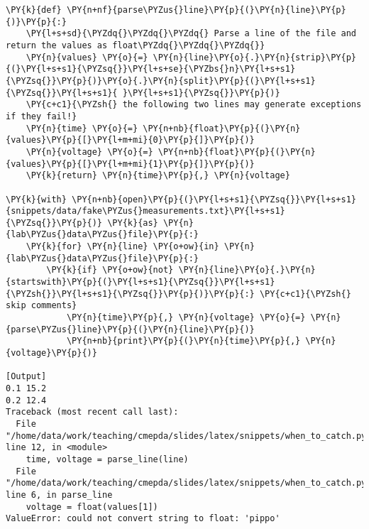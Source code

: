 \begin{Verbatim}[label=\makebox{\url{https://github.com/lucabaldini/cmepda/tree/master/slides/latex/snippets/when\_to\_catch.py}},commandchars=\\\{\}]
\PY{k}{def} \PY{n+nf}{parse\PYZus{}line}\PY{p}{(}\PY{n}{line}\PY{p}{)}\PY{p}{:}
    \PY{l+s+sd}{\PYZdq{}\PYZdq{}\PYZdq{} Parse a line of the file and return the values as float\PYZdq{}\PYZdq{}\PYZdq{}}
    \PY{n}{values} \PY{o}{=} \PY{n}{line}\PY{o}{.}\PY{n}{strip}\PY{p}{(}\PY{l+s+s1}{\PYZsq{}}\PY{l+s+se}{\PYZbs{}n}\PY{l+s+s1}{\PYZsq{}}\PY{p}{)}\PY{o}{.}\PY{n}{split}\PY{p}{(}\PY{l+s+s1}{\PYZsq{}}\PY{l+s+s1}{ }\PY{l+s+s1}{\PYZsq{}}\PY{p}{)}
    \PY{c+c1}{\PYZsh{} the following two lines may generate exceptions if they fail!}
    \PY{n}{time} \PY{o}{=} \PY{n+nb}{float}\PY{p}{(}\PY{n}{values}\PY{p}{[}\PY{l+m+mi}{0}\PY{p}{]}\PY{p}{)}
    \PY{n}{voltage} \PY{o}{=} \PY{n+nb}{float}\PY{p}{(}\PY{n}{values}\PY{p}{[}\PY{l+m+mi}{1}\PY{p}{]}\PY{p}{)}
    \PY{k}{return} \PY{n}{time}\PY{p}{,} \PY{n}{voltage}

\PY{k}{with} \PY{n+nb}{open}\PY{p}{(}\PY{l+s+s1}{\PYZsq{}}\PY{l+s+s1}{snippets/data/fake\PYZus{}measurements.txt}\PY{l+s+s1}{\PYZsq{}}\PY{p}{)} \PY{k}{as} \PY{n}{lab\PYZus{}data\PYZus{}file}\PY{p}{:}
    \PY{k}{for} \PY{n}{line} \PY{o+ow}{in} \PY{n}{lab\PYZus{}data\PYZus{}file}\PY{p}{:}
        \PY{k}{if} \PY{o+ow}{not} \PY{n}{line}\PY{o}{.}\PY{n}{startswith}\PY{p}{(}\PY{l+s+s1}{\PYZsq{}}\PY{l+s+s1}{\PYZsh{}}\PY{l+s+s1}{\PYZsq{}}\PY{p}{)}\PY{p}{:} \PY{c+c1}{\PYZsh{} skip comments}
            \PY{n}{time}\PY{p}{,} \PY{n}{voltage} \PY{o}{=} \PY{n}{parse\PYZus{}line}\PY{p}{(}\PY{n}{line}\PY{p}{)}
            \PY{n+nb}{print}\PY{p}{(}\PY{n}{time}\PY{p}{,} \PY{n}{voltage}\PY{p}{)}

[Output]
0.1 15.2
0.2 12.4
Traceback (most recent call last):
  File "/home/data/work/teaching/cmepda/slides/latex/snippets/when_to_catch.py", line 12, in <module>
    time, voltage = parse_line(line)
  File "/home/data/work/teaching/cmepda/slides/latex/snippets/when_to_catch.py", line 6, in parse_line
    voltage = float(values[1])
ValueError: could not convert string to float: 'pippo'
\end{Verbatim}